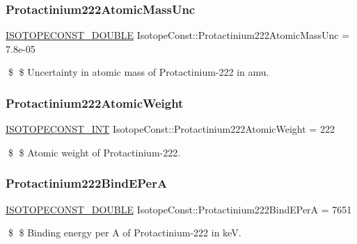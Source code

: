 \subsubsection{\texorpdfstring{Protactinium222\+Atomic\+Mass\+Unc}{Protactinium222AtomicMassUnc}}
{\footnotesize\ttfamily \mbox{\hyperlink{group___isotope_const-_macros_ga8f45a7272ce02c0b4c65c44636ed719a}{I\+S\+O\+T\+O\+P\+E\+C\+O\+N\+S\+T\+\_\+\+D\+O\+U\+B\+LE}} Isotope\+Const\+::\+Protactinium222\+Atomic\+Mass\+Unc = 7.\+8e-\/05}

\$ \$ Uncertainty in atomic mass of Protactinium-\/222 in amu. \mbox{\label{group___isotope_const-_protactinium-_pa222_gaeabea049a6bc5626afa02e64023cd1f5}} 
\subsubsection{\texorpdfstring{Protactinium222\+Atomic\+Weight}{Protactinium222AtomicWeight}}
{\footnotesize\ttfamily \mbox{\hyperlink{group___isotope_const-_macros_ga5f18360b3e99483a35c32d789e62621c}{I\+S\+O\+T\+O\+P\+E\+C\+O\+N\+S\+T\+\_\+\+I\+NT}} Isotope\+Const\+::\+Protactinium222\+Atomic\+Weight = 222}

\$ \$ Atomic weight of Protactinium-\/222. \mbox{\label{group___isotope_const-_protactinium-_pa222_ga4fcd000f23511561549e0235e6d77aa2}} 
\subsubsection{\texorpdfstring{Protactinium222\+Bind\+E\+PerA}{Protactinium222BindEPerA}}
{\footnotesize\ttfamily \mbox{\hyperlink{group___isotope_const-_macros_ga8f45a7272ce02c0b4c65c44636ed719a}{I\+S\+O\+T\+O\+P\+E\+C\+O\+N\+S\+T\+\_\+\+D\+O\+U\+B\+LE}} Isotope\+Const\+::\+Protactinium222\+Bind\+E\+PerA = 7651}

\$ \$ Binding energy per A of Protactinium-\/222 in keV. \mbox{\label{group___isotope_const-_protactinium-_pa222_ga5a318d58399974fe66be484c2c52d088}} 
